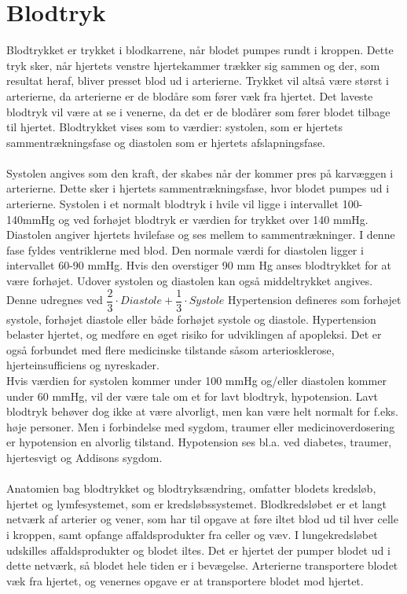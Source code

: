 \section{Blodtryk}
Blodtrykket er trykket i blodkarrene, når blodet pumpes rundt i kroppen. Dette tryk sker, når hjertets venstre hjertekammer trækker sig sammen og der, som resultat heraf, bliver presset blod ud i arterierne. Trykket vil altså være størst i arterierne, da arterierne er de blodåre som fører væk fra hjertet. Det laveste blodtryk vil være at se i venerne, da det er de blodårer som fører blodet tilbage til hjertet. Blodtrykket vises som to værdier: systolen, som er hjertets sammentrækningsfase og diastolen som er hjertets afslapningsfase. \\\\
Systolen angives som den kraft, der skabes når der kommer pres på karvæggen i arterierne. Dette sker i hjertets sammentrækningsfase, hvor blodet pumpes ud i arterierne. Systolen i et normalt blodtryk i hvile vil ligge i intervallet 100-140mmHg og ved forhøjet blodtryk er værdien for trykket over 140 mmHg.\\ Diastolen angiver hjertets hvilefase og ses mellem to sammentrækninger. I denne fase fyldes ventriklerne med blod. Den normale værdi for diastolen ligger i intervallet 60-90 mmHg. Hvis den overstiger 90 mm Hg anses blodtrykket for at være forhøjet. Udover systolen og diastolen kan også middeltrykket angives. Denne udregnes ved $\dfrac{2}{3}\cdot Diastole + \dfrac{1}{3}\cdot Systole$ \cite{blodtrykwiki}
Hypertension defineres som forhøjet systole, forhøjet diastole eller både forhøjet systole og diastole. Hypertension belaster hjertet, og medføre en øget risiko for udviklingen af apopleksi. Det er også forbundet med flere medicinske tilstande såsom arteriosklerose, hjerteinsufficiens og nyreskader. \cite{pulmonal}\\
Hvis værdien for systolen kommer under 100 mmHg og/eller diastolen kommer under 60 mmHg, vil der være tale om et for lavt blodtryk, hypotension. Lavt blodtryk behøver dog ikke at være alvorligt, men kan være helt normalt for f.eks. høje personer. Men i forbindelse med sygdom, traumer eller medicinoverdosering er hypotension en alvorlig tilstand. Hypotension ses bl.a. ved diabetes, traumer, hjertesvigt og Addisons sygdom. \cite{hypo}
\\\\
Anatomien bag blodtrykket og blodtryksændring, omfatter blodets kredsløb, hjertet og lymfesystemet, som er kredsløbssystemet. Blodkredsløbet er et langt netværk af arterier og vener, som har til opgave at føre iltet blod ud til hver celle i kroppen, samt opfange affaldsprodukter fra celler og væv.\cite{pulmonal}  I lungekredsløbet udskilles affaldsprodukter og blodet iltes. Det er hjertet der pumper blodet ud i dette netværk, så blodet hele tiden er i bevægelse. Arterierne transportere blodet væk fra hjertet, og venernes opgave er at transportere blodet mod hjertet. 
